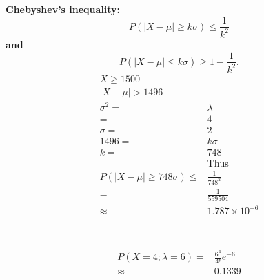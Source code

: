 \documentclass{article}
\begin{document}
            \subsubsection{}
                \paragraph{
                    Chebyshev's inequality:
                    $$
                    P(|X-\mu|\geq k\sigma)\leq \frac{1}{k^2}
                    $$
                    and
                    $$
                    P(|X-\mu|\leq k\sigma)\geq 1-\frac{1}{k^2}.
                    $$
                    \begin{equation*}
                        \begin{split}
                            X\geq 1500\\
                            |X-\mu|>1496\\
                            \sigma^2=&\lambda\\
                                =&4\\
                            \sigma=&2\\
                            1496=&k\sigma\\
                            k=&748\\
                            &\text{Thus}\\
                            P(|X-\mu|\geq 748\sigma)\leq& \frac{1}{748^2}\\
                                =&\frac{1}{559504}\\
                                \approx&1.787\times 10^{-6}\\
                        \end{split}
                    \end{equation*}
                }
    \section{}
        \subsection{}
            \paragraph{
                \begin{equation*}
                    \begin{split}
                        P(X=4;\lambda=6)=&\frac{6^4}{4!}e^{-6}\\
                            \approx&0.1339\\
                    \end{split}
                \end{equation*}
            }
\end{document}
